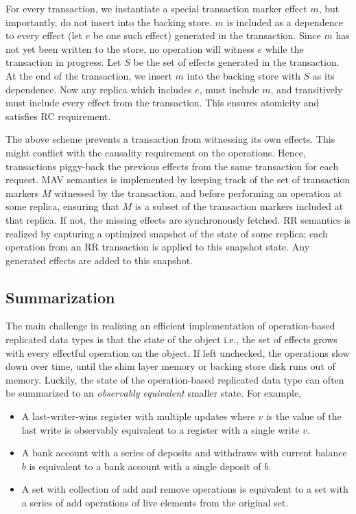 For every transaction, we instantiate a special transaction marker effect $m$,
but importantly, do not insert into the backing store. $m$ is included as a
dependence to every effect (let $e$ be one such effect) generated in the
transaction. Since $m$ has not yet been written to the store, no operation will
witness $e$ while the transaction in progress. Let $S$ be the set of effects
generated in the transaction. At the end of the transaction, we insert $m$ into
the backing store with $S$ as its dependence. Now any replica which includes
$e$, must include $m$, and transitively must include every effect from the
transaction. This ensures atomicity and satisfies RC requirement.

The above scheme prevents a transaction from witnessing its own effects. This
might conflict with the causality requirement on the operations. Hence,
transactions piggy-back the previous effects from the same transaction for each
request. MAV semantics is implemented by keeping track of the set of
transaction markers $M$ witnessed by the transaction, and before performing an
operation at some replica, ensuring that $M$ is a subset of the transaction
markers included at that replica. If not, the missing effects are synchronously
fetched. RR semantics is realized by capturing a optimized snapshot of the
state of some replica; each operation from an RR transaction is applied to this
snapshot state. Any generated effects are added to this snapshot.

\subsection{Summarization}

The main challenge in realizing an efficient implementation of operation-based
replicated data types is that the state of the object i.e., the set of effects
grows with every effectful operation on the object. If left unchecked, the
operations slow down over time, until the shim layer memory or backing store
disk runs out of memory. Luckily, the state of the operation-based replicated
data type can often be summarized to an \emph{observably equivalent} smaller
state. For example,

\begin{itemize}
\setlength{\itemsep}{2pt}
\item A last-writer-wins register with multiple updates where $v$ is the value
of the last write is observably equivalent to a register with a single write
$v$.

\item A bank account with a series of deposits and withdraws with current
balance $b$ is equivalent to a bank account with a single deposit of $b$.

\item A set with collection of add and remove operations is equivalent to a set
with a series of add operations of live elements from the original set.
\end{itemize}

